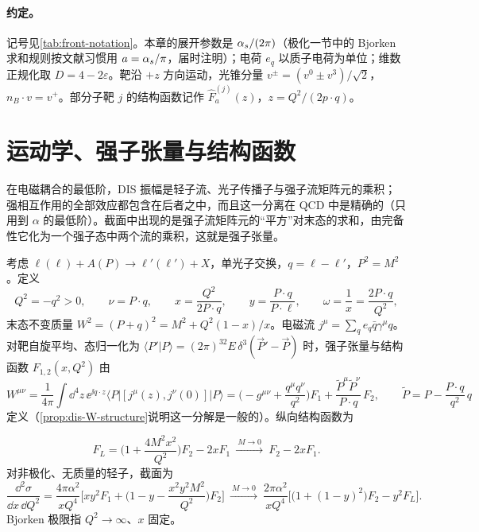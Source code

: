 \paragraph{约定。}记号见\cref{tab:front-notation}。本章的展开参数是 $\alpha_s/(2\pi)$（极化一节中的 Bjorken 求和规则按文献习惯用 $a=\alpha_s/\pi$，届时注明）；电荷 $e_q$ 以质子电荷为单位；维数正规化取 $D=4-2\varepsilon$。靶沿 $+z$ 方向运动，光锥分量 $v^\pm=(v^0\pm v^3)/\sqrt2$，$n_B\cdot v=v^+$。部分子靶 $j$ 的结构函数记作 $\hat F^{(j)}_a(z)$，$z=Q^2/(2p\cdot q)$。

\section{运动学、强子张量与结构函数}\label{sec:dis-kinematics}

在电磁耦合的最低阶，DIS 振幅是轻子流、光子传播子与强子流矩阵元的乘积；强相互作用的全部效应都包含在后者之中，而且这一分离在 QCD 中是精确的（只用到 $\alpha$ 的最低阶）。截面中出现的是强子流矩阵元的“平方”对末态的求和，由完备性它化为一个强子态中两个流的乘积，这就是强子张量。

\begin{definition}\label{def:dis-kinematics}
考虑 $\ell(\ell)+A(P)\to\ell'(\ell')+X$，单光子交换，$q=\ell-\ell'$，$P^2=M^2$。定义
\begin{equation}\label{eq:dis-invariants}
Q^2=-q^2>0,\qquad \nu=P\cdot q,\qquad x=\frac{Q^2}{2P\cdot q},\qquad y=\frac{P\cdot q}{P\cdot\ell},\qquad \omega=\frac1x=\frac{2P\cdot q}{Q^2},
\end{equation}
末态不变质量 $W^2=(P+q)^2=M^2+Q^2(1-x)/x$。电磁流 $j^\mu=\sum_qe_q\bar q\gamma^\mu q$。对靶自旋平均、态归一化为 $\langle P'|P\rangle=(2\pi)^32E\,\delta^3(\vec P'-\vec P)$ 时，强子张量与结构函数 $F_{1,2}(x,Q^2)$ 由
\begin{equation}\label{eq:dis-W}
W^{\mu\nu}=\frac1{4\pi}\int\dd^4z\,\ee^{\ii q\cdot z}\langle P|[j^\mu(z),j^\nu(0)]|P\rangle
=\Big(-g^{\mu\nu}+\frac{q^\mu q^\nu}{q^2}\Big)F_1+\frac{\tilde P^\mu\tilde P^\nu}{P\cdot q}\,F_2,\qquad \tilde P=P-\frac{P\cdot q}{q^2}\,q
\end{equation}
定义（\cref{prop:dis-W-structure}说明这一分解是一般的）。纵向结构函数为%

\begin{equation}\label{eq:dis-FL}
F_L=\Big(1+\frac{4M^2x^2}{Q^2}\Big)F_2-2xF_1\ \xrightarrow{\ M\to0\ }\ F_2-2xF_1 .
\end{equation}
对非极化、无质量的轻子，截面为
\begin{equation}\label{eq:dis-xsec}
\frac{\dd^2\sigma}{\dd x\,\dd Q^2}=\frac{4\pi\alpha^2}{xQ^4}\Big[xy^2F_1+\Big(1-y-\frac{x^2y^2M^2}{Q^2}\Big)F_2\Big]
\ \xrightarrow{\ M\to0\ }\ \frac{2\pi\alpha^2}{xQ^4}\Big[\big(1+(1-y)^2\big)F_2-y^2F_L\Big].
\end{equation}
Bjorken 极限指 $Q^2\to\infty$、$x$ 固定。
\end{definition}

